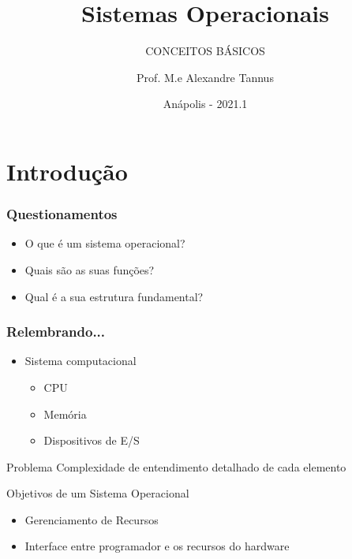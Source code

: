 \documentclass[aspectratio=169,
				xcolor=table]{beamer}
\institute[]{\uppercase{Engenharia de Software}}
\title[]{Sistemas Operacionais}
\subtitle[]{\uppercase{Conceitos Básicos}}
\author[]{Prof. M.e Alexandre Tannus}
\date{Anápolis - 2021.1}
\begin{document}
	\begin{frame}
		\titlepage
		
	\end{frame}

	\begin{frame}
		\tableofcontents
	\end{frame}	
	
	\section{Introdução}
	
	\begin{frame}
		\frametitle{Questionamentos}
		\begin{itemize}
			\item O que é um sistema operacional?
			\vspace{1em}
			\item Quais são as suas funções?
			\vspace{1em}
			\item Qual é a sua estrutura fundamental?
		\end{itemize}
	\end{frame}	
	
	\begin{frame}
		\frametitle{Relembrando...}
		\begin{itemize}
			\item Sistema computacional
			\begin{itemize}
				\item CPU
				\item Memória
				\item Dispositivos de E/S
			\end{itemize}
		\end{itemize}	
		\vspace{1em}
		\begin{block}{Problema}			
			\alert{Complexidade de entendimento detalhado de cada elemento }
						

		\end{block}			
	\end{frame}
	
	\begin{frame}{Objetivos de um Sistema Operacional}
		\begin{itemize}
			\item Gerenciamento de Recursos
			\item Interface entre programador e os recursos do hardware
		\end{itemize}
	\end{frame}
	
\end{document}
